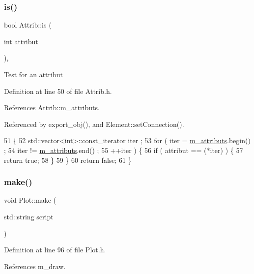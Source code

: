 \subsubsection{\texorpdfstring{is()}{is()}}
{\footnotesize\ttfamily bool Attrib\+::is (\begin{DoxyParamCaption}\item[{int}]{attribut }\end{DoxyParamCaption})\hspace{0.3cm}{\ttfamily [inline]}, {\ttfamily [inherited]}}

Test for an attribut 

Definition at line 50 of file Attrib.\+h.



References Attrib\+::m\+\_\+attributs.



Referenced by export\+\_\+obj(), and Element\+::set\+Connection().


\begin{DoxyCode}
51   \{
52     std::vector<int>::const\_iterator iter ;
53     \textcolor{keywordflow}{for} ( iter  = \hyperlink{classAttrib_ac4bd58a0cc6b38a3b711d609a3d3aacc}{m\_attributs}.begin() ;
54           iter != \hyperlink{classAttrib_ac4bd58a0cc6b38a3b711d609a3d3aacc}{m\_attributs}.end()   ;
55           ++iter ) \{
56       \textcolor{keywordflow}{if} ( attribut == (*iter) ) \{
57         \textcolor{keywordflow}{return} \textcolor{keyword}{true};
58       \}
59     \}
60     \textcolor{keywordflow}{return} \textcolor{keyword}{false};
61   \}
\end{DoxyCode}
\mbox{\label{classPlot_abe449e7c57a55f3bf0ee9201d07d497d}} 
\subsubsection{\texorpdfstring{make()}{make()}}
{\footnotesize\ttfamily void Plot\+::make (\begin{DoxyParamCaption}\item[{std\+::string}]{script }\end{DoxyParamCaption})\hspace{0.3cm}{\ttfamily [inline]}}



Definition at line 96 of file Plot.\+h.



References m\+\_\+draw.


